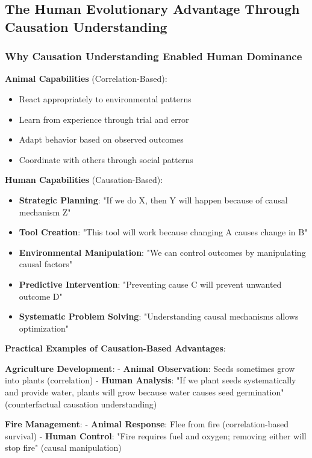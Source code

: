 \documentclass[12pt,a4paper]{article}
\begin{document}
\subsection{The Human Evolutionary Advantage Through Causation Understanding}

\subsubsection{Why Causation Understanding Enabled Human Dominance}

\textbf{Animal Capabilities} (Correlation-Based):
\begin{itemize}
\item React appropriately to environmental patterns
\item Learn from experience through trial and error
\item Adapt behavior based on observed outcomes
\item Coordinate with others through social patterns
\end{itemize}

\textbf{Human Capabilities} (Causation-Based):
\begin{itemize}
\item \textbf{Strategic Planning}: "If we do X, then Y will happen because of causal mechanism Z"
\item \textbf{Tool Creation}: "This tool will work because changing A causes change in B"
\item \textbf{Environmental Manipulation}: "We can control outcomes by manipulating causal factors"
\item \textbf{Predictive Intervention}: "Preventing cause C will prevent unwanted outcome D"
\item \textbf{Systematic Problem Solving}: "Understanding causal mechanisms allows optimization"
\end{itemize}

\textbf{Practical Examples of Causation-Based Advantages}:

\textbf{Agriculture Development}:
- \textbf{Animal Observation}: Seeds sometimes grow into plants (correlation)
- \textbf{Human Analysis}: "If we plant seeds systematically and provide water, plants will grow because water causes seed germination" (counterfactual causation understanding)

\textbf{Fire Management}:
- \textbf{Animal Response}: Flee from fire (correlation-based survival)
- \textbf{Human Control}: "Fire requires fuel and oxygen; removing either will stop fire" (causal manipulation)
\end{document}

